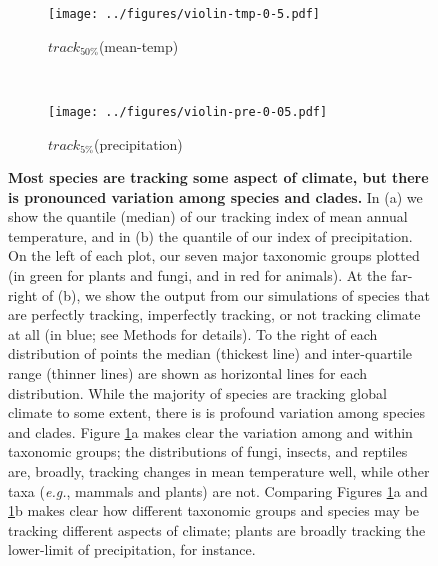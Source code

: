 \documentclass[12pt]{report}
\begin{document}
\clearpage
\clearpage
\begin{figure}[h!]
  \begin{center}
    \begin{subfigure}{.7\textwidth}
      \texttt{[image: ../figures/violin-tmp-0-5.pdf]}
      \caption{$track_{50\%}$(mean-temp)}
    \end{subfigure}
    \\
    \begin{subfigure}{.7\textwidth}
      \texttt{[image: ../figures/violin-pre-0-05.pdf]}
      \caption{$track_{5\%}$(precipitation)}
    \end{subfigure}
  \end{center}
  \caption{\textbf{Most species are tracking some aspect of climate,
      but there is pronounced variation among species and clades.} In
    (a) we show the  quantile (median) of our tracking index
    of mean annual temperature, and in (b) the  quantile of our
    index of precipitation. On the left of each plot, our seven major
    taxonomic groups plotted (in green for plants and fungi, and in
    red for animals). At the far-right of (b), we show the output from
    our simulations of species that are perfectly tracking,
    imperfectly tracking, or not tracking climate at all (in blue; see
    Methods for details). To the right of each distribution of points
    the median (thickest line) and inter-quartile range (thinner
    lines) are shown as horizontal lines for each distribution. While
    the majority of species are tracking global climate to some
    extent, there is is profound variation among species and
    clades. Figure \ref{overview}a makes clear the variation among and
    within taxonomic groups; the distributions of fungi, insects, and
    reptiles are, broadly, tracking changes in mean temperature well,
    while other taxa (\emph{e.g.}, mammals and plants) are
    not. Comparing Figures \ref{overview}a and \ref{overview}b makes
    clear how different taxonomic groups and species may be tracking
    different aspects of climate; plants are broadly tracking the
    lower-limit of precipitation, for instance.}
  \label{overview}
\end{figure}
\end{document}
